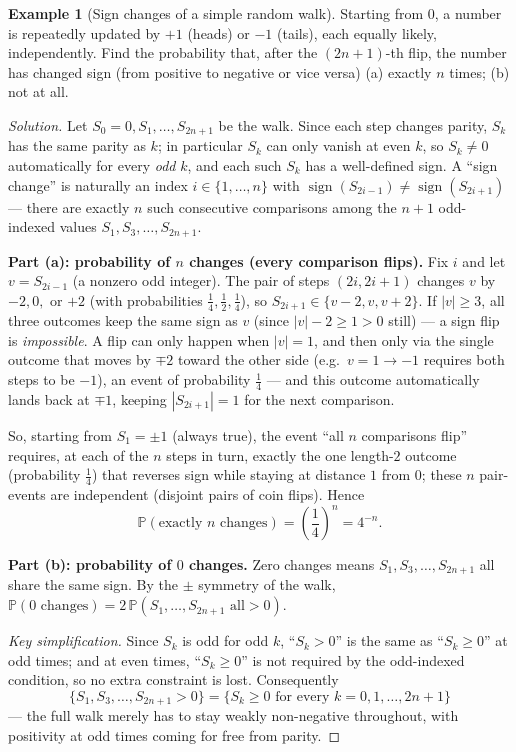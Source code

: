 \documentclass[11pt]{article}
\theoremstyle{definition}
\newtheorem{example}{Example}[section]
\begin{document}
\begin{example}[Sign changes of a simple random walk]
Starting from $0$, a number is repeatedly updated by $+1$ (heads) or $-1$ (tails), each equally likely, independently. Find the probability that, after the $(2n+1)$-th flip, the number has changed sign (from positive to negative or vice versa) (a) exactly $n$ times; (b) not at all.
\end{example}
\begin{proof}[Solution]
Let $S_0=0,S_1,\dots,S_{2n+1}$ be the walk. Since each step changes parity, $S_k$ has the same parity as $k$; in particular $S_k$ can only vanish at even $k$, so $S_k\neq0$ automatically for every \emph{odd} $k$, and each such $S_k$ has a well-defined sign. A ``sign change'' is naturally an index $i\in\{1,\dots,n\}$ with $\operatorname{sign}(S_{2i-1})\neq\operatorname{sign}(S_{2i+1})$ — there are exactly $n$ such consecutive comparisons among the $n+1$ odd-indexed values $S_1,S_3,\dots,S_{2n+1}$.

\textbf{Part (a): probability of $n$ changes (every comparison flips).} Fix $i$ and let $v=S_{2i-1}$ (a nonzero odd integer). The pair of steps $(2i,2i+1)$ changes $v$ by $-2,0,$ or $+2$ (with probabilities $\tfrac14,\tfrac12,\tfrac14$), so $S_{2i+1}\in\{v-2,v,v+2\}$. If $|v|\ge3$, all three outcomes keep the same sign as $v$ (since $|v|-2\ge1>0$ still) — a sign flip is \emph{impossible}. A flip can only happen when $|v|=1$, and then only via the single outcome that moves by $\mp2$ toward the other side (e.g.\ $v=1\to-1$ requires both steps to be $-1$), an event of probability $\tfrac14$ — and this outcome automatically lands back at $\mp1$, keeping $|S_{2i+1}|=1$ for the next comparison.

So, starting from $S_1=\pm1$ (always true), the event ``all $n$ comparisons flip'' requires, at each of the $n$ steps in turn, exactly the one length-$2$ outcome (probability $\tfrac14$) that reverses sign while staying at distance $1$ from $0$; these $n$ pair-events are independent (disjoint pairs of coin flips). Hence
\[
\mathbb P(\text{exactly }n\text{ changes})=\left(\frac14\right)^n=\boxed{4^{-n}}.
\]

\textbf{Part (b): probability of $0$ changes.} Zero changes means $S_1,S_3,\dots,S_{2n+1}$ all share the same sign. By the $\pm$ symmetry of the walk, $\mathbb P(0\text{ changes})=2\,\mathbb P(S_1,\dots,S_{2n+1}\text{ all}>0)$.

\emph{Key simplification.} Since $S_k$ is odd for odd $k$, ``$S_k>0$'' is the same as ``$S_k\ge0$'' at odd times; and at even times, ``$S_k\ge0$'' is not required by the odd-indexed condition, so no extra constraint is lost. Consequently
\[
\{S_1,S_3,\dots,S_{2n+1}>0\}=\{S_k\ge0\text{ for every }k=0,1,\dots,2n+1\}
\]
— the full walk merely has to stay weakly non-negative throughout, with positivity at odd times coming for free from parity.


\end{proof}
\end{document}
